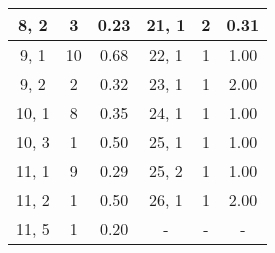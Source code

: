 \begin{table}[h]
\begin{tabular}{|c|c|c|c|c|c|}
\hline 
     8,  2 &          3 &       0.23 &     21,  1 &          2 &       0.31 \\ 
\hline 
     9,  1 &         10 &       0.68 &     22,  1 &          1 &       1.00 \\ 
\hline 
     9,  2 &          2 &       0.32 &     23,  1 &          1 &       2.00 \\ 
\hline 
    10,  1 &          8 &       0.35 &     24,  1 &          1 &       1.00 \\ 
\hline 
    10,  3 &          1 &       0.50 &     25,  1 &          1 &       1.00 \\ 
\hline 
    11,  1 &          9 &       0.29 &     25,  2 &          1 &       1.00 \\ 
\hline 
    11,  2 &          1 &       0.50 &     26,  1 &          1 &       2.00 \\ 
\hline 
    11,  5 &          1 &       0.20 &          - &          - &          - \\ 
\hline 
\end{tabular}
\end{table}
